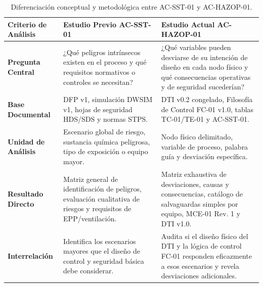 \documentclass[10pt,letterpaper]{article}
\begin{document}
\begin{table}[H]
\centering\small
\caption{Diferenciación conceptual y metodológica entre AC-SST-01 y AC-HAZOP-01.} \label{tab:dif_sst_hazop}
\begin{tabularx}{\textwidth}{p{3.0cm} >{\raggedright\arraybackslash}X >{\raggedright\arraybackslash}X}
\toprule
\textbf{Criterio de Análisis} & \textbf{Estudio Previo AC-SST-01} & \textbf{Estudio Actual AC-HAZOP-01} \\
\midrule
\textbf{Pregunta Central} & ¿Qué peligros intrínsecos existen en el proceso y qué requisitos normativos o controles se necesitan? & ¿Qué variables pueden desviarse de su intención de diseño en cada nodo físico y qué consecuencias operativas y de seguridad sucederían? \\
\textbf{Base Documental} & DFP v1, simulación DWSIM v1, hojas de seguridad HDS/SDS y normas STPS. & DTI v0.2 congelado, Filosofía de Control FC-01 v1.0, tablas TC-01/TE-01 y AC-SST-01. \\
\textbf{Unidad de Análisis} & Escenario global de riesgo, sustancia química peligrosa, tipo de exposición o equipo mayor. & Nodo físico delimitado, variable de proceso, palabra guía y desviación específica. \\
\textbf{Resultado Directo} & Matriz general de identificación de peligros, evaluación cualitativa de riesgos y requisitos de EPP/ventilación. & Matriz exhaustiva de desviaciones, causas y consecuencias, catálogo de salvaguardas simples por equipo, MCE-01 Rev. 1 y DTI v1.0. \\
\textbf{Interrelación} & Identifica los escenarios mayores que el diseño de control y seguridad básica debe considerar. & Audita si el diseño físico del DTI y la lógica de control FC-01 responden eficazmente a esos escenarios y revela desviaciones adicionales. \\
\bottomrule
\end{tabularx}
\end{table}
\end{document}
